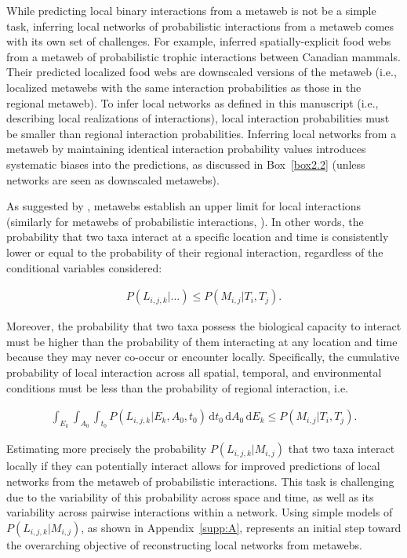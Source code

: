 While predicting local binary interactions from a metaweb is not be a simple
task, inferring local networks of probabilistic interactions from a metaweb
comes with its own set of challenges. For example, \cite{Dansereau2024Spatially}
inferred spatially-explicit food webs from a metaweb of probabilistic trophic
interactions between Canadian mammals. Their predicted localized food webs are
downscaled versions of the metaweb (i.e., localized metawebs with the same
interaction probabilities as those in the regional metaweb). To infer local
networks as defined in this manuscript (i.e., describing local realizations of
interactions), local interaction probabilities must be smaller than regional
interaction probabilities. Inferring local networks from a metaweb by
maintaining identical interaction probability values introduces systematic
biases into the predictions, as discussed in Box~\ref{box2.2} (unless networks are seen as
downscaled metawebs).

As suggested by \cite{McLeod2021Sampling}, metawebs establish an upper limit for
local interactions (similarly for metawebs of probabilistic interactions,
\cite{Strydom2023Grapha}). In other words, the probability that two taxa interact
at a specific location and time is consistently lower or equal to the
probability of their regional interaction, regardless of the conditional
variables considered:

\begin{eqnarray}
  \label{eq:switch}
  P(L_{i, j, k} | ...) \le P(M_{i, j} | T_i, T_j).
\end{eqnarray}

Moreover, the probability that two taxa possess the biological capacity to
interact must be higher than the probability of them interacting at any location
and time because they may never co-occur or encounter locally. Specifically, the
cumulative probability of local interaction across all spatial, temporal, and
environmental conditions must be less than the probability of regional
interaction, i.e.

\begin{eqnarray}
  \label{eq:all}
  \int_{E_k}\int_{A_0}\int_{t_0} P(L_{i, j, k} | E_k, A_0, t_0) \, \text{d}t_0
\, \text{d}A_0 \,\text{d}E_k \leq P(M_{i, j} | T_i, T_j).
\end{eqnarray}

Estimating more precisely the probability $P(L_{i, j, k}|M_{i, j})$ that two
taxa interact locally if they can potentially interact allows for improved
predictions of local networks from the metaweb of probabilistic interactions.
This task is challenging due to the variability of this probability across space
and time, as well as its variability across pairwise interactions within a
network. Using simple models of $P(L_{i, j, k}|M_{i, j})$, as shown in
Appendix~\ref{supp:A}, represents an initial step toward the overarching
objective of reconstructing local networks from metawebs.

